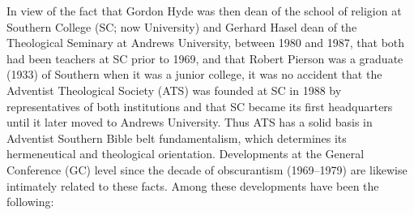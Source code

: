 In view of the fact that Gordon Hyde was then dean of the school of religion
at Southern College (SC; now University) and Gerhard Hasel dean
of the Theological Seminary at Andrews University, between 1980 and 1987,
that both had been teachers at SC prior to 1969, and that Robert Pierson
was a graduate (1933) of Southern when it was a junior college, it was no
accident that the Adventist Theological Society (ATS) was founded at SC in
1988 by representatives of both institutions and that SC became its first
headquarters until it later moved to Andrews University. Thus ATS has a
solid basis in Adventist Southern Bible belt fundamentalism, which
determines its hermeneutical and theological orientation.
\newpage
Developments at the General Conference (GC) level since the decade of
obscurantism (1969--1979) are likewise intimately related to these facts.
Among these developments have been the following:
